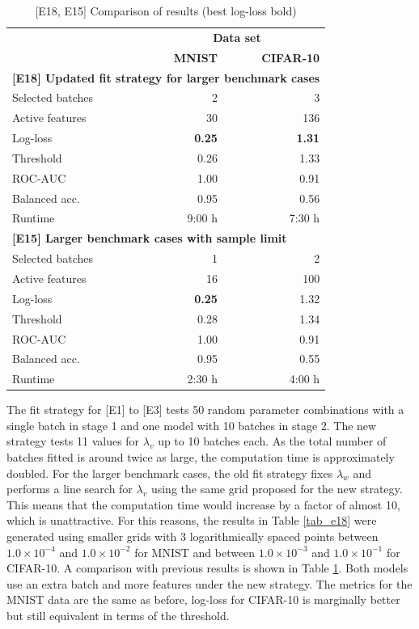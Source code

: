 %
\begin{table}
\caption{[E18, E15] Comparison of results (best log-loss bold)}
\label{tab_e18_e15}
%
\begin{center}
\small
\begin{tabular}{|lrr|}
\hline
&\multicolumn{2}{c|}{\textbf{\hrulefill\ Data set \hrulefill}}\\
&\textbf{MNIST}&\textbf{CIFAR-10}\\
\multicolumn{3}{|l|}{\textbf{[E18] Updated fit strategy for larger benchmark cases}}\\
Selected batches&2&3\\
Active features&30&136\\
Log-loss&\textbf{0.25}&\textbf{1.31}\\
Threshold&0.26&1.33\\
ROC-AUC&1.00&0.91\\
Balanced acc.&0.95&0.56\\
Runtime&9:00 h&7:30 h\\
\multicolumn{3}{|l|}{\textbf{[E15] Larger benchmark cases with sample limit}}\\
Selected batches&1&2\\
Active features&16&100\\
Log-loss&\textbf{0.25}&1.32\\
Threshold&0.28&1.34\\
ROC-AUC&1.00&0.91\\
Balanced acc.&0.95&0.55\\
Runtime&2:30 h&4:00 h\\
\hline
\end{tabular}
\end{center}
\end{table}
%
The fit strategy for [E1] to [E3] tests 50 random parameter combinations with a single batch in stage 1 and one model with 10 batches in stage 2.
The new strategy tests 11 values for $\lambda_v$ up to 10 batches each.
As the total number of batches fitted is around twice as large, the computation time is approximately doubled.
For the larger benchmark cases, the old fit strategy fixes $\lambda_w$ and performs a line search for $\lambda_v$ using the same grid proposed for the new strategy.
This means that the computation time would increase by a factor of almost 10, which is unattractive.
For this reasons, the results in Table \ref{tab_e18} were generated using smaller grids with 3 logarithmically spaced points between $1.0\times10^{-4}$ and $1.0\times10^{-2}$ for MNIST and between $1.0\times10^{-3}$ and $1.0\times10^{-1}$ for CIFAR-10.
A comparison with previous results is shown in Table \ref{tab_e18_e15}.
Both models use an extra batch and more features under the new strategy.
The metrics for the MNIST data are the same as before, log-loss for CIFAR-10 is marginally better but still equivalent in terms of the threshold.
%
\clearpage
%
